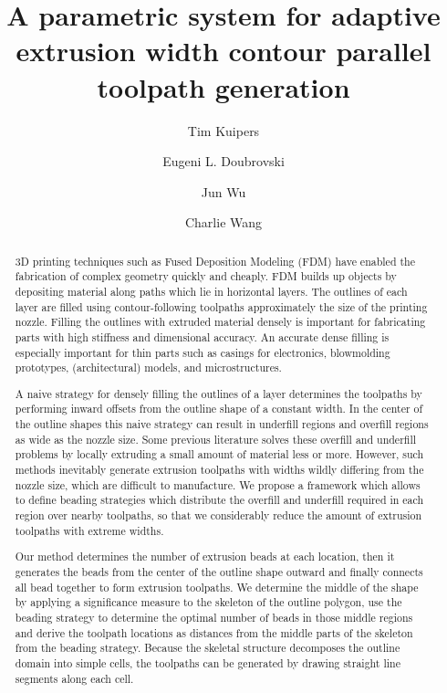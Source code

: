 \documentclass[5p,twocolumn,10pt,times]{elsarticle}
\theoremstyle{definition}
\begin{document}
\baselineskip11pt %

\begin{frontmatter} %

\title{A parametric system for adaptive extrusion width contour parallel toolpath generation}


\author[um,tud]{Tim Kuipers}
\author[tud]{Eugeni L. Doubrovski}
\author[tud]{Jun Wu}
\author[cuhk]{Charlie Wang{}}
\address[um]{Ultimaker, Utrecht, The Netherlands}
\address[tud]{Department of Design Engineering, Delft University of Technology, The Netherlands}
\address[cuhk]{Department of Mechanical and Automation Engineering, The Chinese University of Hong Kong, Hong Kong SAR, China}


\begin{abstract}
3D printing techniques such as Fused Deposition Modeling (FDM) have enabled the fabrication of complex geometry quickly and cheaply. 
FDM builds up objects by depositing material along paths which lie in horizontal layers.
The outlines of each layer are filled using contour-following toolpaths approximately the size of the printing nozzle.
Filling the outlines with extruded material densely is important for fabricating parts with high stiffness and dimensional accuracy.
An accurate dense filling is especially important for thin parts such as casings for electronics, blowmolding prototypes, (architectural) models, and microstructures.

A naive strategy for densely filling the outlines of a layer determines the toolpaths by performing inward offsets from the outline shape of a constant width.
In the center of the outline shapes this naive strategy can result in underfill regions and overfill regions as wide as the nozzle size.
Some previous literature solves these overfill and underfill problems by locally extruding a small amount of material less or more.
However, such methods inevitably generate extrusion toolpaths with widths wildly differing from the nozzle size, which are difficult to manufacture.
We propose a framework which allows to define beading strategies which distribute the overfill and underfill required in each region over nearby toolpaths, so that we considerably reduce the amount of extrusion toolpaths with extreme widths.

Our method determines the number of extrusion beads at each location, then it generates the beads from the center of the outline shape outward and finally connects all bead together to form extrusion toolpaths.
We determine the middle of the shape by applying a significance measure to the skeleton of the outline polygon, use the beading strategy to determine the optimal number of beads in those middle regions and derive the toolpath locations as distances from the middle parts of the skeleton from the beading strategy.
Because the skeletal structure decomposes the outline domain into simple cells, the toolpaths can be generated by drawing straight line segments along each cell.


\end{abstract}
\end{frontmatter}
\end{document}
